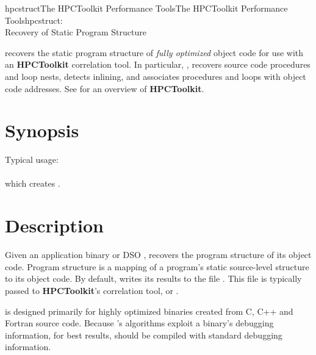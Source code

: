 \documentclass[english]{article}
\begin{document}
\begin{Name}{1}{hpcstruct}{The HPCToolkit Performance Tools}{The HPCToolkit Performance Tools}{hpcstruct:\\ Recovery of Static Program Structure}

 recovers the static program structure of \emph{fully optimized} object code for use with an \textbf{HPCToolkit} correlation tool.
In particular, , recovers source code procedures and loop nests, detects inlining, and associates procedures and loops with object code addresses.
See  for an overview of \textbf{HPCToolkit}.

\end{Name}

\section{Synopsis}

  

Typical usage:\\
\SP\SP\SP{} \\
which creates .

\section{Description}

Given an application binary or DSO ,  recovers the program structure of its object code.
Program structure is a mapping of a program's static source-level structure to its object code.
By default,  writes its results to the file .
This file is typically passed to \textbf{HPCToolkit}'s correlation tool,  or .

 is designed primarily for highly optimized binaries created from C, C++ and Fortran source code.
Because 's algorithms exploit a binary's debugging information, for best results,  should be compiled with standard debugging information.

\end{document}
